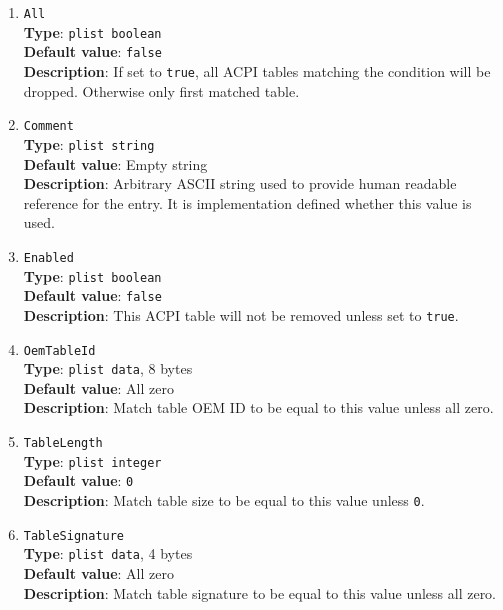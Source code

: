\documentclass[]{article}
\begin{document}
\begin{enumerate}
\item
  \texttt{All}\\
  \textbf{Type}: \texttt{plist\ boolean}\\
  \textbf{Default value}: \texttt{false}\\
  \textbf{Description}: If set to \texttt{true}, all ACPI tables matching the
  condition will be dropped. Otherwise only first matched table.

\item
  \texttt{Comment}\\
  \textbf{Type}: \texttt{plist\ string}\\
  \textbf{Default value}: Empty string\\
  \textbf{Description}: Arbitrary ASCII string used to provide human readable
  reference for the entry. It is implementation defined whether this value is
  used.

\item
  \texttt{Enabled}\\
  \textbf{Type}: \texttt{plist\ boolean}\\
  \textbf{Default value}: \texttt{false}\\
  \textbf{Description}: This ACPI table will not be removed unless set to
  \texttt{true}.

\item
  \texttt{OemTableId}\\
  \textbf{Type}: \texttt{plist\ data}, 8 bytes\\
  \textbf{Default value}: All zero\\
  \textbf{Description}: Match table OEM ID to be equal to this value
  unless all zero.

\item
  \texttt{TableLength}\\
  \textbf{Type}: \texttt{plist\ integer}\\
  \textbf{Default value}: \texttt{0}\\
  \textbf{Description}: Match table size to be equal to this value
  unless \texttt{0}.

\item
  \texttt{TableSignature}\\
  \textbf{Type}: \texttt{plist\ data}, 4 bytes\\
  \textbf{Default value}: All zero\\
  \textbf{Description}: Match table signature to be equal to this value
  unless all zero.

\end{enumerate}
\end{document}
